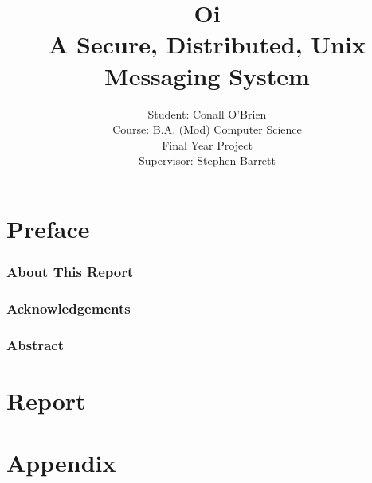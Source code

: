 \documentclass[a4paper,12pt]{report}
\begin{document}
\title{Oi \\ A Secure, Distributed, Unix Messaging System}

\author{Student: Conall O'Brien \\ 
		  Course:  B.A. (Mod) Computer Science \\
		  Final Year Project \\ 
		  Supervisor: Stephen Barrett} 


\date{}
\maketitle


\part*{Preface}


\section{About This Report}



\pagebreak


\section{Acknowledgements}



\pagebreak

\section{Abstract}



\tableofcontents

\listoftables

\listoffigures


\part*{Report}







\part*{Appendix}

\appendix



%



\end{document}
